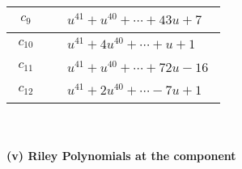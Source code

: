 \documentclass[1p]{elsarticle_modified}
\theoremstyle{definition}
\begin{document}
\begin{tabular}{m{50pt}|m{274pt}}
\hline $$\begin{aligned}c_{9}\end{aligned}$$&$\begin{aligned}
&u^{41}+u^{40}+\cdots+43 u+7
\end{aligned}$\\
\hline $$\begin{aligned}c_{10}\end{aligned}$$&$\begin{aligned}
&u^{41}+4 u^{40}+\cdots+u+1
\end{aligned}$\\
\hline $$\begin{aligned}c_{11}\end{aligned}$$&$\begin{aligned}
&u^{41}+u^{40}+\cdots+72 u-16
\end{aligned}$\\
\hline $$\begin{aligned}c_{12}\end{aligned}$$&$\begin{aligned}
&u^{41}+2 u^{40}+\cdots-7 u+1
\end{aligned}$\\
\hline
\end{tabular}\\~\\
\newpage\renewcommand{\arraystretch}{1}
\flushleft \textbf{(v) Riley Polynomials at the component}\newline \\
\end{document}
